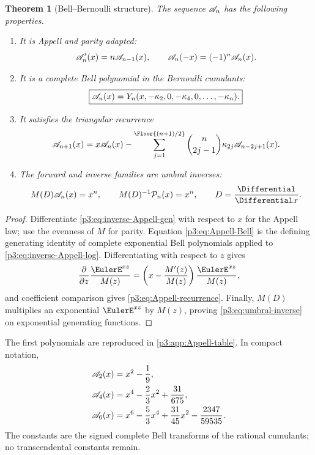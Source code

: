 \documentclass[11pt,oneside]{article}
\numberwithin{equation}{section}
\newtheorem{theorem}{Theorem}[section]
\theoremstyle{definition}
\theoremstyle{remark}
\begin{document}
\begin{theorem}[Bell--Bernoulli structure]
\label{p3:thm:Appell-Bell}
The sequence $\mathscr A_n$ has the following properties.
\begin{enumerate}
\item It is Appell and parity adapted:
\begin{equation}
 \mathscr A_n'(x)=n\mathscr A_{n-1}(x),
 \qquad
 \mathscr A_n(-x)=(-1)^n\mathscr A_n(x).
 \label{p3:eq:Appell-basic}
\end{equation}
\item It is a complete Bell polynomial in the Bernoulli cumulants:
\begin{equation}
 \boxed{\displaystyle
 \mathscr A_n(x)=Y_n(x,-\kappa_2,0,-\kappa_4,0,\ldots,-\kappa_n).}
 \label{p3:eq:Appell-Bell}
\end{equation}
\item It satisfies the triangular recurrence
\begin{equation}
 \Acal_{n+1}(x)
 =x\Acal_n(x)
 -\sum_{j=1}^{\Floor{(n+1)/2}}
 \binom n{2j-1}\kappa_{2j}\Acal_{n-2j+1}(x).
 \label{p3:eq:Appell-recurrence}
\end{equation}
\item The forward and inverse families are umbral inverses:
\begin{equation}
 M(D)\Acal_n(x)=x^n,
 \qquad
 M(D)^{-1}\Pcal_n(x)=x^n,
 \qquad D=\frac{\Differential}{\Differential x}.
 \label{p3:eq:umbral-inverse}
\end{equation}
\end{enumerate}
\end{theorem}

\begin{proof}
Differentiate \eqref{p3:eq:inverse-Appell-gen} with respect to $x$ for the Appell law; use the evenness of $M$ for parity.  Equation \eqref{p3:eq:Appell-Bell} is the defining generating identity of complete exponential Bell polynomials applied to \eqref{p3:eq:inverse-Appell-log}.  Differentiating with respect to $z$ gives
\[
 \frac{\partial}{\partial z}\frac{\EulerE^{xz}}{M(z)}
 =\left(x-\frac{M'(z)}{M(z)}\right)\frac{\EulerE^{xz}}{M(z)},
\]
and coefficient comparison gives \eqref{p3:eq:Appell-recurrence}.  Finally, $M(D)$ multiplies an exponential $\EulerE^{xz}$ by $M(z)$, proving \eqref{p3:eq:umbral-inverse} on exponential generating functions.
\end{proof}

The first polynomials are reproduced in \cref{p3:app:Appell-table}.  In compact notation,
\begin{align*}
 \mathscr A_2(x)&=x^2-\frac19,\\
 \mathscr A_4(x)&=x^4-\frac23x^2+\frac{31}{675},\\
 \mathscr A_6(x)&=x^6-\frac53x^4+\frac{31}{45}x^2-\frac{2347}{59535}.
\end{align*}
The constants are the signed complete Bell transforms of the rational cumulants; no transcendental constants remain.
\end{document}
